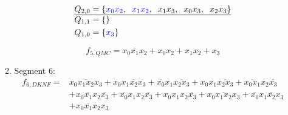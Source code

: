 \documentclass[a4paper]{article}
\begin{document}
\begin{enumerate}[label=\alph*)]
\begin{enumerate}[label=\roman*)]
\begin{align*}
			Q_{2,0} &= \{\textcolor{blue}{x_0x_2},\hspace{0.2cm}\textcolor{blue}{x_1x_2},\hspace{0.2cm} x_1x_3,\hspace{0.2cm} x_0x_3,\hspace{0.2cm}x_2x_3\}\\
			\hline
			Q_{1,1} &= \{ \}\\
			Q_{1,0} &= \{\textcolor{blue}{x_3}\}\\
		\end{align*}
		
		\begin{equation*}
			f_{5, QMC} = \overline{x_0x_1x_2} + x_0x_2 + x_1x_2 + x_3
		\end{equation*}
		
		
		\item Segment 6:
		\begin{equation*}
		\begin{aligned}
			f_{6, DKNF} =
			& \overline{x_0 x_1 x_2 x_3} 
			+ x_0\overline{x_1x_2x_3}
			+ \overline{x_0}x_1\overline{x_2 x_3}
			+ x_0x_1\overline{x_2 x_3}
			+ \overline{x_0 x_1}x_2\overline{x_3} \\
			&+ x_0 \overline{x_1} x_2 \overline{x_3} 
			+ \overline{x_0} x_1 x_2 \overline{x_3} 
			+ x_0 x_1 x_2 \overline{x_3} 
			+ x_0 \overline{x_1 x_2} x_3 
			+ \overline{x_0} x_1 \overline{x_2} x_3 \\ 
			&+ x_0 \overline{x_1} x_2 x_3  
		\end{aligned}
		\end{equation*}
		

\end{enumerate}
\end{enumerate}
\end{document}
